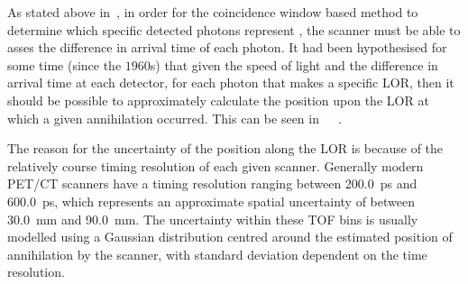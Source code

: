                 As stated above in~, in order for the coincidence window based method to determine which specific detected photons represent , the scanner must be able to asses the difference in arrival time of each photon. %
                It had been hypothesised for some time (since the $1960$s) that given the speed of light and the difference in arrival time at each detector, for each photon that makes a specific \gls{LOR}, then it should be possible to approximately calculate the position upon the \gls{LOR} at which a given annihilation occurred. %
                This can be seen in~~~.
                
                The reason for the uncertainty of the position along the \gls{LOR} is because of the relatively course timing resolution of each given scanner. Generally modern \gls{PET}/\gls{CT} scanners have a timing resolution ranging between \SI{200.0}{\pico\second} and \SI{600.0}{\pico\second}, which represents an approximate spatial uncertainty of between \SI{30.0}{\milli\metre} and \SI{90.0}{\milli\metre}. %
                The uncertainty within these \gls{TOF} bins is usually modelled using a Gaussian distribution centred around the estimated position of annihilation by the scanner, with standard deviation dependent on the time resolution.
                
                
